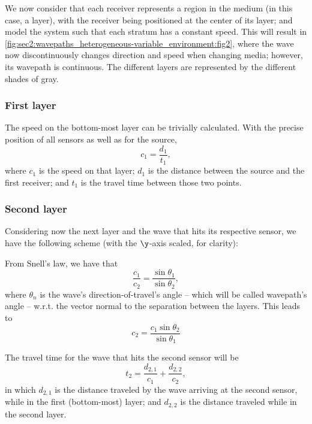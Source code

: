 

We now consider that each receiver represents a region in the medium (in this case, a layer), with the receiver being positioned at the center of its layer; and model the system such that each stratum has a constant speed. This will result in \cref{fig:sec2:wavepaths_heterogeneous-variable_environment:fig2}, where the wave now discontinuously changes direction and speed when changing media; however, its wavepath is continuous. The different layers are represented by the different shades of gray.



\subsubsection{First layer}
The speed on the bottom-most layer can be trivially calculated. With the precise position of all sensors as well as for the source, 
\begin{equation}
	c_1 = \frac{d_1}{t_1},
\end{equation}
where $c_1$ is the speed on that layer; $d_1$ is the distance between the source and the first receiver; and $t_1$ is the travel time between those two points.

\subsubsection{Second layer}
Considering now the next layer and the wave that hits its respective sensor, we have the following scheme (with the $\y$-axis scaled, for clarity):



From Snell's law, we have that
\begin{equation}
	\frac{c_1}{c_2} = \frac{\sin \theta_1}{\sin \theta_2},
\end{equation}
where $\theta_n$ is the wave's direction-of-travel's angle -- which will be called wavepath's angle -- w.r.t. the vector normal to the separation between the layers. This leads to
\begin{equation}
	c_2 = \frac{c_1 \sin \theta_2}{\sin \theta_1}
\end{equation}

The travel time for the wave that hits the second sensor will be
\begin{equation}
	t_2 = \frac{d_{2,1}}{c_1} + \frac{d_{2,2}}{c_2},
\end{equation}
in which $d_{2,1}$ is the distance traveled by the wave arriving at the second sensor, while in the first (bottom-most) layer; and $d_{2,2}$ is the distance traveled while in the second layer.

